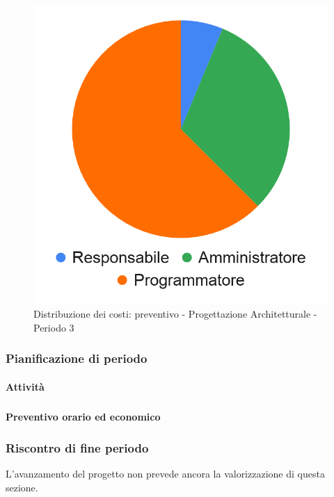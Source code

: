 \hspace{-1cm}
\begin{minipage}{.50\textwidth}
\smallPreventivoTable{
	
}
\end{minipage}
\hspace{1cm}
\begin{minipage}{.40\textwidth}
\begin{figure}[H]
	\includegraphics[scale=0.21]{res/images/charts/preventivo_priori/Grafico4-5.png}
	\caption{Distribuzione dei costi: preventivo - Progettazione Architetturale - Periodo 3}
\end{figure}
\end{minipage} 


\subsubsection{Pianificazione di periodo}



\paragraph{Attività}
\subparagraph*{}

\planningTable{
	
}



\paragraph{Preventivo orario ed economico}
\subparagraph*{}

\contabilitaTable{
	
}

\subsubsection{Riscontro di fine periodo}


L'avanzamento del progetto non prevede ancora la valorizzazione di questa sezione.